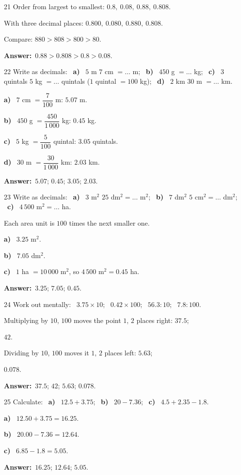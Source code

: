 \documentclass[11pt]{article}
\newif\ifsol \solfalse
\providecommand{\AnsWord}{Đáp số}
\newcommand{\dapso}[1]{\par\textbf{\AnsWord:}\ #1}
\newcommand{\probsol}[1]{%
  \begin{lrbox}{\solmeasure}\begin{minipage}{\dimexpr\linewidth-24pt\relax}#1\end{minipage}\end{lrbox}%
  \ifsol
    \begin{solbox}#1\end{solbox}%
  \else
    \setlength{\solht}{\dimexpr\ht\solmeasure+\dp\solmeasure+0.85cm\relax}%
    \ifdim\solht<1.35cm\setlength{\solht}{1.35cm}\fi
    \begin{tcolorbox}[colback=white,colframe=Line,boxrule=0.8pt,arc=5pt,
      left=8pt,right=8pt,top=4pt,bottom=4pt,height=\solht]{\footnotesize\color{Slate}\itshape\WorkWord}\end{tcolorbox}%
  \fi}
\newcommand{\pa}[1]{\textbf{#1)}\ }
\newcommand{\gap}{\vspace{0.3cm}}
\def\WorkWord{Your work:}
\def\AnsWord{Answer}
\begin{document}
\gap
\begin{probbox}{21}{\relax}
Order from largest to smallest: $0.8,\ 0.08,\ 0.88,\ 0.808$.
\end{probbox}
\probsol{
With three decimal places: $0.800,\ 0.080,\ 0.880,\ 0.808$.\par Compare: $880>808>800>80$.
\dapso{$0.88>0.808>0.8>0.08$.}}
\gap
\begin{probbox}{22}{\relax}
Write as decimals: \ \pa{a} $5$ m $7$ cm $=\ldots$ m; \ \pa{b} $450$ g $=\ldots$ kg; \ \pa{c} $3$ quintals $5$ kg $=\ldots$ quintals ($1$ quintal $=100$ kg); \ \pa{d} $2$ km $30$ m $=\ldots$ km.
\end{probbox}
\probsol{
\pa{a} $7$ cm $=\dfrac7{100}$ m: $5.07$ m.\par \pa{b} $450$ g $=\dfrac{450}{1\,000}$ kg: $0.45$ kg.\par \pa{c} $5$ kg $=\dfrac5{100}$ quintal: $3.05$ quintals.\par \pa{d} $30$ m $=\dfrac{30}{1\,000}$ km: $2.03$ km.
\dapso{$5.07$; $0.45$; $3.05$; $2.03$.}}
\gap
\begin{probbox}{23}{\relax}
Write as decimals: \ \pa{a} $3$ m$^2$ $25$ dm$^2=\ldots$ m$^2$; \ \pa{b} $7$ dm$^2$ $5$ cm$^2=\ldots$ dm$^2$; \ \pa{c} $4\,500$ m$^2=\ldots$ ha.
\end{probbox}
\probsol{
Each area unit is $100$ times the next smaller one.\par \pa{a} $3.25$ m$^2$.\par \pa{b} $7.05$ dm$^2$.\par \pa{c} $1$ ha $=10\,000$ m$^2$, so $4\,500$ m$^2=0.45$ ha.
\dapso{$3.25$; $7.05$; $0.45$.}}
\gap
\begin{probbox}{24}{\relax}
Work out mentally: \ $3.75\times10$; \ $0.42\times100$; \ $56.3:10$; \ $7.8:100$.
\end{probbox}
\probsol{
Multiplying by $10$, $100$ moves the point $1$, $2$ places right: $37.5$;\par $42$.\par Dividing by $10$, $100$ moves it $1$, $2$ places left: $5.63$;\par $0.078$.
\dapso{$37.5$; $42$; $5.63$; $0.078$.}}
\gap
\begin{probbox}{25}{\relax}
Calculate: \ \pa{a} $12.5+3.75$; \ \pa{b} $20-7.36$; \ \pa{c} $4.5+2.35-1.8$.
\end{probbox}
\probsol{
\pa{a} $12.50+3.75=16.25$.\par \pa{b} $20.00-7.36=12.64$.\par \pa{c} $6.85-1.8=5.05$.
\dapso{$16.25$; $12.64$; $5.05$.}}
\end{document}
